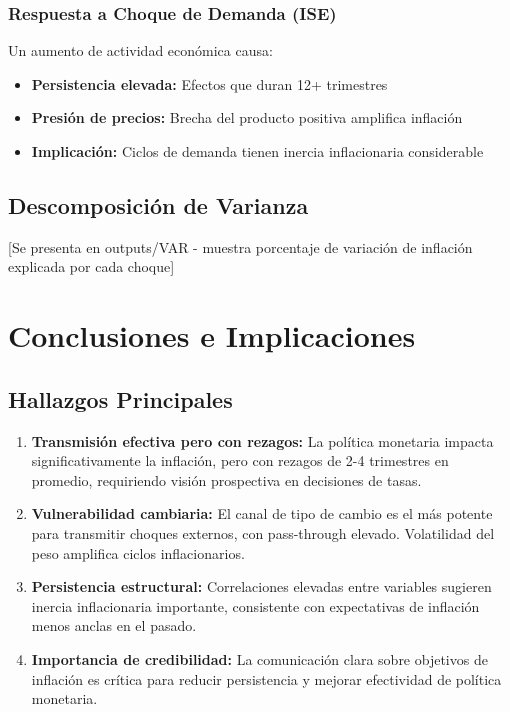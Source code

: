 \documentclass[12pt,a4paper]{article}
\begin{document}
\subsubsection{Respuesta a Choque de Demanda (ISE)}

Un aumento de actividad económica causa:
\begin{itemize}
\item \textbf{Persistencia elevada:} Efectos que duran 12+ trimestres
\item \textbf{Presión de precios:} Brecha del producto positiva amplifica inflación
\item \textbf{Implicación:} Ciclos de demanda tienen inercia inflacionaria considerable
\end{itemize}

\subsection{Descomposición de Varianza}

[Se presenta en outputs/VAR - muestra porcentaje de variación de inflación explicada por cada choque]

\section{Conclusiones e Implicaciones}
\label{sec:conclusiones}

\subsection{Hallazgos Principales}

\begin{enumerate}
\item \textbf{Transmisión efectiva pero con rezagos:} La política monetaria impacta significativamente la inflación, pero con rezagos de 2-4 trimestres en promedio, requiriendo visión prospectiva en decisiones de tasas.

\item \textbf{Vulnerabilidad cambiaria:} El canal de tipo de cambio es el más potente para transmitir choques externos, con pass-through elevado. Volatilidad del peso amplifica ciclos inflacionarios.

\item \textbf{Persistencia estructural:} Correlaciones elevadas entre variables sugieren inercia inflacionaria importante, consistente con expectativas de inflación menos anclas en el pasado.

\item \textbf{Importancia de credibilidad:} La comunicación clara sobre objetivos de inflación es crítica para reducir persistencia y mejorar efectividad de política monetaria.
\end{enumerate}
\end{document}
